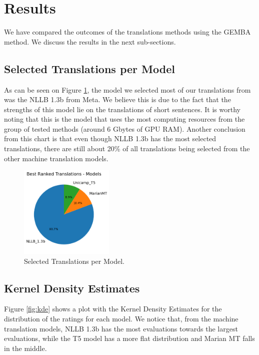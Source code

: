 \documentclass[runningheads]{llncs}
\begin{document}
\section{Results}

We have compared the outcomes of the translations methods using the GEMBA method. We discuss the results in the next sub-sections.

\subsection{Selected Translations per Model}

As can be seen on Figure \ref{fig:pie}, the model we selected most of our
translations from was the NLLB 1.3b from Meta. We believe this is due to the
fact that the strengths of this model lie on the translations of short
sentences. It is worthy noting that this is the model that uses the most
computing resources from the group of tested methods (around 6 Gbytes of GPU RAM).
Another conclusion from this chart is that even though NLLB 1.3b has the most
selected translations, there are still about 20\% of all translations being
selected from the other machine translation models.

\begin{figure}[htbp]
    \centering
    \includegraphics[width=0.4\textwidth]{figures/pie-chart.png}
    \caption{Selected Translations per Model.}\label{fig:pie}
\end{figure}
\FloatBarrier

\subsection{Kernel Density Estimates}

Figure \ref{fig:kde} shows a plot with the Kernel Density Estimates for the
distribution of the ratings for each model. We notice that, from the machine
translation models, NLLB 1.3b has the most evaluations towards the largest
evaluations, while the T5 model has a more flat distribution and Marian MT falls
in the middle.
\end{document}
